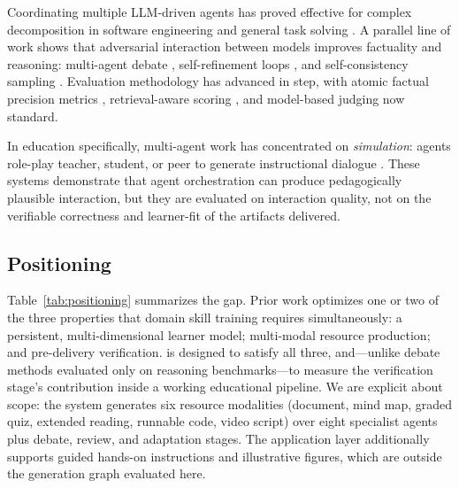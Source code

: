 Coordinating multiple LLM-driven agents has proved effective for complex
decomposition in software engineering \cite{hong2023metagpt,qian2023chatdev}
and general task solving \cite{wu2023autogen}. A parallel line of work shows
that adversarial interaction between models improves factuality and reasoning:
multi-agent debate \cite{du2023improving,liang2023encouraging}, self-refinement
loops \cite{madaan2023selfrefine,shinn2023reflexion}, and self-consistency
sampling \cite{wang2022selfconsistency}. Evaluation methodology has advanced
in step, with atomic factual precision metrics \cite{min2023factscore},
retrieval-aware scoring \cite{es2023ragas}, and model-based judging
\cite{zheng2023judging,chiang2024chatbotarena} now standard.

In education specifically, multi-agent work has concentrated on
\emph{simulation}: agents role-play teacher, student, or peer to generate
instructional dialogue \cite{zhang2024simulating}. These systems demonstrate
that agent orchestration can produce pedagogically plausible interaction, but
they are evaluated on interaction quality, not on the verifiable correctness
and learner-fit of the artifacts delivered.

\subsection{Positioning}

Table~\ref{tab:positioning} summarizes the gap. Prior work optimizes one or
two of the three properties that domain skill training requires
simultaneously: a persistent, multi-dimensional learner model; multi-modal
resource production; and pre-delivery verification. \sysname{} is designed to
satisfy all three, and---unlike debate methods evaluated only on reasoning
benchmarks---to measure the verification stage's contribution inside a
working educational pipeline. We are explicit about scope: the system generates
six resource modalities (document, mind map, graded quiz, extended reading,
runnable code, video script) over eight specialist agents plus debate, review,
and adaptation stages. The application layer additionally supports guided
hands-on instructions and illustrative figures, which are outside the
generation graph evaluated here.

